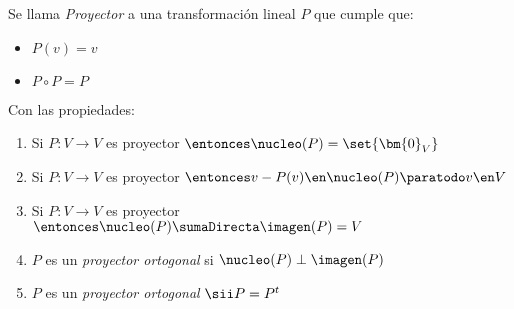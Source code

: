 \begin{enumerate}[label=\tiny\purple{\faIcon{snowman}}]
        Se llama  \textit{Proyector} a una transformación lineal $P$ que cumple que:
        \begin{itemize}
          \item $P(v) = v$
          \item $P \circ P = P$
        \end{itemize}
        Con las propiedades:
        \begin{enumerate}[label=\poo]
          \item Si $P: V \to V$ es proyector $\entonces \nucleo(P) = \set{\bm{0}_V}$
          \item Si $P: V \to V$ es proyector $\entonces v - P(v) \en \nucleo(P) \paratodo v \en V$
          \item Si $P: V \to V$ es proyector $\entonces \nucleo(P) \sumaDirecta \imagen(P) = V$
          \item $P$ es un \textit{proyector ortogonal} si $\nucleo(P) \perp \imagen(P)$
          \item $P$ es un \textit{proyector ortogonal} $\sii P = P^t$
        \end{enumerate}
\end{enumerate}
